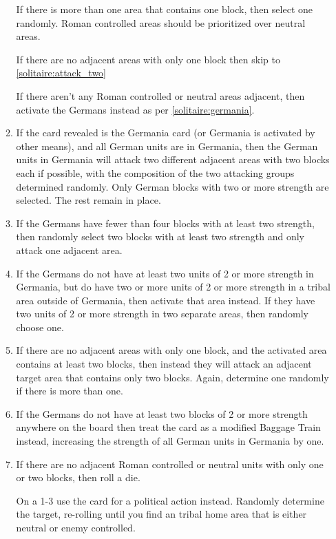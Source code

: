 \begin{enumerate}
\begin{enumerate}[leftmargin=0in]
    If there is more than one area that contains one block, then select one randomly. Roman controlled areas should be prioritized over neutral areas.

    If there are no adjacent areas with only one block then skip to \ref{solitaire:attack_two}

    If there aren't any Roman controlled or neutral areas adjacent, then activate the Germans instead as per \ref{solitaire:germania}.

    \item \label{solitaire:germania}If the card revealed is the Germania card (or Germania is activated by other means), and all German units are in Germania, then the German units in Germania will attack two different adjacent areas with two blocks each if possible, with the composition of the two attacking groups determined randomly. Only German blocks with two or more strength are selected. The rest remain in place.

    \item If the Germans have fewer than four blocks with at least two strength, then randomly select two blocks with at least two strength and only attack one adjacent area.

    \item If the Germans do not have at least two units of 2 or more strength in Germania, but do have two or more units of 2 or more strength in a tribal area outside of Germania, then activate that area instead. If they have two units of 2 or more strength in two separate areas, then randomly choose one.

    \item \label{solitaire:attack_two}If there are no adjacent areas with only one block, and the activated area contains at least two blocks, then instead they will attack an adjacent target area that contains only two blocks. Again, determine one randomly if there is more than one.

    \item If the Germans do not have at least two blocks of 2 or more strength anywhere on the board then treat the card as a modified Baggage Train instead, increasing the strength of all German units in Germania by one.

    \item If there are no adjacent Roman controlled or neutral units with only one or two blocks, then roll a die.

    On a 1-3 use the card for a political action instead. Randomly determine the target, re-rolling until you find an tribal home area that is either neutral or enemy controlled.


\end{enumerate}
\end{enumerate}
